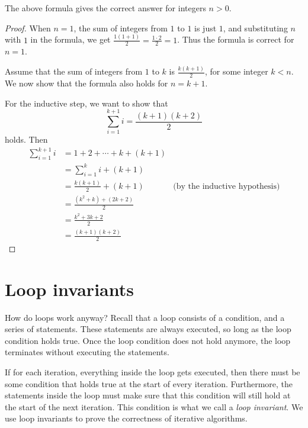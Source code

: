 \begin{claim}
The above formula gives the correct answer for integers $n>0$.
\end{claim}
\begin{proof}
    When $n=1$, the sum of integers from $1$ to $1$ is just $1$, and substituting $n$ with $1$ in the formula, we get $\frac{1\left(1+1\right)}{2} = \frac{1\cdot 2}{2} = 1$. Thus the formula is correct for $n=1$.

    Assume that the sum of integers from $1$ to $k$ is $\frac{k\left(k+1\right)}{2}$, for some integer $k < n$. We now show that the formula also holds for $n = k+1$.

    For the inductive step, we want to show that
\[
    \sum_{i=1}^{k+1} i = \frac{\left(k+1\right) \left(k+2\right)}{2}
\]
holds. Then
    \begin{align*}
        \sum_{i=1}^{k+1} i &= 1 + 2 + \cdots + k + \left(k+1\right) \\
        &= \sum_{i=1}^{k} i + \left(k+1\right) \\
        &= \frac{k\left(k+1\right)}{2} + \left(k+1\right) & \text{(by the inductive hypothesis)} \\
        &= \frac{\left(k^2 + k\right) + \left(2k + 2\right)}{2} \\
        &= \frac{k^2 + 3k + 2}{2} \\
        &= \frac{\left(k+1\right) \left(k+2\right)}{2}
    \end{align*}
\end{proof}

\section{Loop invariants}
How do loops work anyway? Recall that a loop consists of a condition, and a series of statements. These statements are always executed, so long as the loop condition holds true. Once the loop condition does not hold anymore, the loop terminates without executing the statements.

If for each iteration, everything inside the loop gets executed, then there must be some condition that holds true at the start of every iteration. Furthermore, the statements inside the loop must make sure that this condition will still hold at the start of the next iteration. This condition is what we call a \textit{loop invariant}. We use loop invariants to prove the correctness of iterative algorithms.

